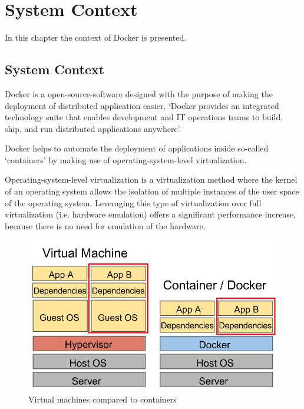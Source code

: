 \chapter{System Context}
\label{ch:context}

In this chapter the context of Docker is presented.%

\section{System Context}
Docker is a open-source-software designed with the purpose of making the deployment of distributed application easier.
`Docker provides an integrated technology suite that enables development and IT operations teams to build, ship, and run distributed applications anywhere'\cite{whatisdocker}.

Docker helps to automate the deployment of applications inside so-called `containers' by making use of operating-system-level virtualization.

Operating-system-level virtualization is a virtualization method where the kernel of an operating system allows the isolation of multiple instances of the user space of the operating system. Leveraging this type of virtualization over full virtualization (i.e. hardware emulation) offers a significant performance increase, because there is no need for emulation of the hardware.\cite{VirtualizationTechnologies}

\begin{figure}[b!]
\centering
\includegraphics[scale=0.40,keepaspectratio=true]{./2-context/vmvsdocker}
\caption{Virtual machines compared to containers\cite{benchmarker}}
\label{fig:vmvsdocker}
\end{figure}

